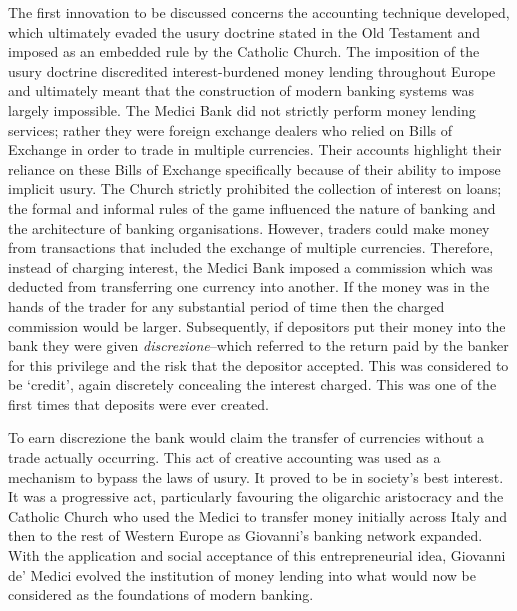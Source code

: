 The first innovation to be discussed concerns the accounting technique developed, which ultimately evaded the usury doctrine stated in the Old Testament and imposed as an embedded rule by the Catholic Church. The imposition of the usury doctrine discredited interest-burdened money lending throughout Europe and ultimately meant that the construction of modern banking systems was largely impossible. The Medici Bank did not strictly perform money lending services; rather they were foreign exchange dealers who relied on Bills of Exchange in order to trade in multiple currencies. Their accounts highlight their reliance on these Bills of Exchange specifically because of their ability to impose implicit usury. The Church strictly prohibited the collection of interest on loans; the formal and informal rules of the game influenced the nature of banking and the architecture of banking organisations. However, traders could make money from transactions that included the exchange of multiple currencies. Therefore, instead of charging interest, the Medici Bank imposed a commission which was deducted from transferring one currency into another. If the money was in the hands of the trader for any substantial period of time then the charged commission would be larger. Subsequently, if depositors put their money into the bank they were given \emph{discrezione}--which referred to the return paid by the banker for this privilege and the risk that the depositor accepted. This was considered to be `credit', again discretely concealing the interest charged. This was one of the first times that deposits were ever created.

To earn discrezione the bank would claim the transfer of currencies without a trade actually occurring. This act of creative accounting was used as a mechanism to bypass the laws of usury. It proved to be in society's best interest. It was a progressive act, particularly favouring the oligarchic aristocracy and the Catholic Church who used the Medici to transfer money initially across Italy and then to the rest of Western Europe as Giovanni's banking network expanded. With the application and social acceptance of this entrepreneurial idea, Giovanni de' Medici evolved the institution of money lending into what would now be considered as the foundations of modern banking.

